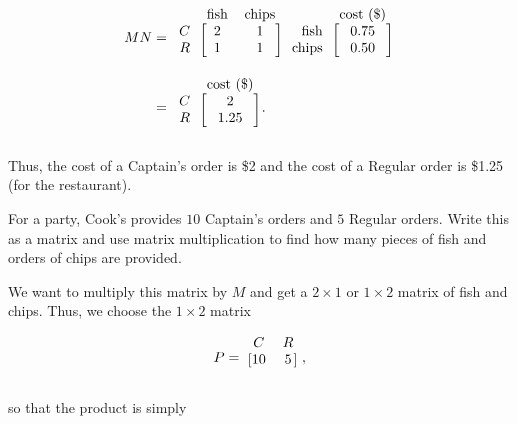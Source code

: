 \documentclass[../key.tex]{subfiles}
\begin{document}
\begin{align*}
MN &= \begin{blockarray}{rcc}
& \text{fish} & \text{chips} \\
\begin{block}{r[cc]}
C & 2 & 1 \\
R & 1 & 1 \\
\end{block}
\end{blockarray}\begin{blockarray}{rc}
& \text{cost (\$)} \\
\begin{block}{r[c]}
\text{fish} & 0.75 \\
\text{chips} & 0.50 \\
\end{block}
\end{blockarray} \\
&= \begin{blockarray}{rc}
& \text{cost (\$)} \\
\begin{block}{r[c]}
C & 2 \\
R & 1.25 \\
\end{block}
\end{blockarray}.
\end{align*}

Thus, the cost of a Captain's order is \$2 and the cost of a Regular order is \$1.25 (for the restaurant).

\begin{inner_problem}
\item For a party, Cook's provides $10$ Captain's orders and $5$ Regular orders. Write this as a matrix and use matrix multiplication to find how many pieces of fish and orders of chips are provided.
\end{inner_problem}

We want to multiply this matrix by $M$ and get a $2\times 1$ or $1\times 2$ matrix of fish and chips. Thus, we choose the $1\times 2$ matrix

$$P=\begin{blockarray}{cc}
C & R \\
\begin{block}{[cc]}
10 & 5 \\
\end{block}
\end{blockarray},$$

so that the product is simply
\end{document}
